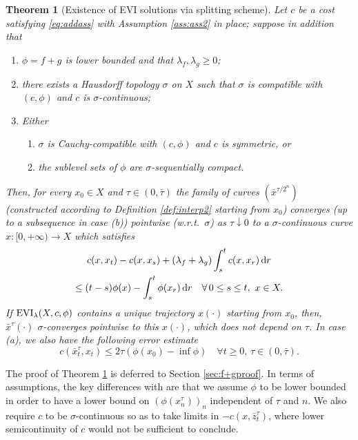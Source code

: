 \documentclass[reqno]{amsart}
\newcounter{results}[section]
\theoremstyle{plain}
\newtheorem{theorem}[results]{Theorem}
\theoremstyle{remark}
\theoremstyle{plain}
\numberwithin{equation}{section}
\theoremstyle{remark}
\newcommand{\de}{{\,\rm d}}
\DeclareMathOperator{\EVI}{{\rm EVI}}
\begin{document}
\begin{theorem}[Existence of EVI solutions  via  splitting scheme]\label{thm:existence_limit_scheme_fg}   Let $c$ be a cost satisfying \eqref{eq:addass} with  Assumption \ref{ass:ass2} in place;   suppose in addition that 
\begin{enumerate}
    \item[\rm (1)] $\phi=f+g$ is lower bounded and that $\lambda_f, \lambda_g \ge 0$;
    \item[\rm (2)]\label{it:c_continuous} 
    there exists a  Hausdorff  topology $\sigma$ on $X$ such that $\sigma$ is compatible with $( c ,\phi)$ and  $c$  is $\sigma$-continuous;
    \item[\rm (3)] Either
    \begin{enumerate}
        \item $\sigma$ is Cauchy-compatible with  $( c,\phi)$ and $c$ is symmetric, or
        \item  the sublevel sets  of  $\phi$ are  $\sigma$-sequentially  compact.
    \end{enumerate}
\end{enumerate}
Then, for every $x_0 \in X$ and $\tau \in (0, \bar{\tau})$ the family of curves $(\bar{x}^{\tau/2^n})$ (constructed according to  Definition \ref{def:interp2}  starting from $x_0$) converges (up to a subsequence in case (b)) pointwise (w.r.t.~$\sigma$) as $\tau \downarrow 0$ to a $\sigma$-continuous curve $x:[0,+\infty) \to X$ which satisfies
\begin{multline}
c(x, x_t )-c(x,  x_s  ) + (\lambda_f+\lambda_g)\int_{s}^t c(x, x_r  ) \de r \\
 \le (t-s)\phi(x)-\int_s^t \phi(x_r) \de r \quad \forall \, 0 \le s \le t, \  x \in X.    \label{eq:evi_fg}
\end{multline}
If $\EVI_\lambda(X,c,\phi)$  contains  a unique trajectory $x(\cdot)$ starting from $x_0$, then, $\bar{x}^{\tau}(\cdot)$ $\sigma$-converges pointwise to this $x(\cdot)$, which does not depend on $\tau$. In case (a), we  also have the following error estimate
\begin{equation}\label{eq:error_estimate_f+g}
    c \left (\bar{x}^{\tau}_t, x_t \right ) \le 2\tau (\phi(x_0)-\inf \phi ) \quad \forall t \ge 0, \, \tau \in (0, \bar{\tau}).
\end{equation}
\end{theorem}
  The proof of Theorem \ref{thm:existence_limit_scheme_fg} is deferred to Section \ref{sec:f+gproof}. In terms of assumptions, the key differences with  are that we assume $\phi$ to be lower bounded in order to have a lower bound on $(\phi(x^\tau_n))_n$ independent of $\tau$ and $n$. We also require $c$ to be $\sigma$-continuous so as to take limits in $-c(x,\bar z^\tau_t)$, where lower semicontinuity of $c$ would not  be sufficient  to conclude. 
\end{document}
